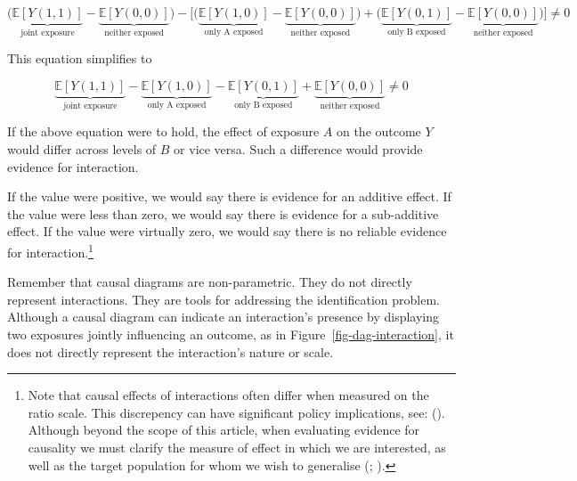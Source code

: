 \documentclass[
  singlecolumn,
  9pt]{article}
\begin{document}
\[\bigg(\underbrace{\mathbb{E}[Y(1,1)]}_{\text{joint exposure}} - \underbrace{\mathbb{E}[Y(0,0)]}_{\text{neither exposed}}\bigg) - \bigg[ \bigg(\underbrace{\mathbb{E}[Y(1,0)]}_{\text{only A exposed}} - \underbrace{\mathbb{E}[Y(0,0)]}_{\text{neither exposed}}\bigg) + \bigg(\underbrace{\mathbb{E}[Y(0,1)]}_{\text{only B exposed}} - \underbrace{\mathbb{E}[Y(0,0)]}_{\text{neither exposed}} \bigg)\bigg] \neq 0 \]

This equation simplifies to

\[ \underbrace{\mathbb{E}[Y(1,1)]}_{\text{joint exposure}} - \underbrace{\mathbb{E}[Y(1,0)]}_{\text{only A exposed}} - \underbrace{\mathbb{E}[Y(0,1)]}_{\text{only B exposed}} + \underbrace{\mathbb{E}[Y(0,0)]}_{\text{neither exposed}} \neq 0 \]

If the above equation were to hold, the effect of exposure \(A\) on the
outcome \(Y\) would differ across levels of \(B\) or vice versa. Such a
difference would provide evidence for interaction.

If the value were positive, we would say there is evidence for an
additive effect. If the value were less than zero, we would say there is
evidence for a sub-additive effect. If the value were virtually zero, we
would say there is no reliable evidence for interaction.\footnote{Note
  that causal effects of interactions often differ when measured on the
  ratio scale. This discrepency can have significant policy
  implications, see: (). Although beyond the scope of this article, when
  evaluating evidence for causality we must clarify the measure of
  effect in which we are interested, as well as the target population
  for whom we wish to generalise (; ).}

Remember that causal diagrams are non-parametric. They do not directly
represent interactions. They are tools for addressing the identification
problem. Although a causal diagram can indicate an interaction's
presence by displaying two exposures jointly influencing an outcome, as
in Figure~\ref{fig-dag-interaction}, it does not directly represent the
interaction's nature or scale.
\end{document}
